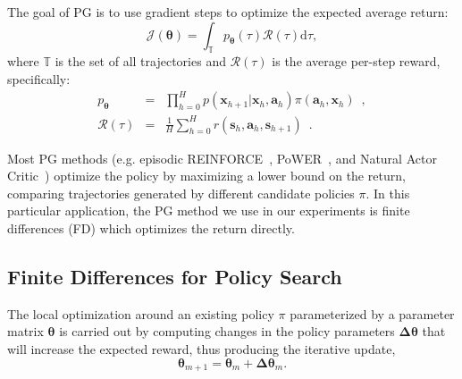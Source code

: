 \documentclass{aamas2016}
\begin{document}
The goal of PG is to use gradient steps to optimize the expected average return:
\begin{equation}
 \mathcal{J}(\boldsymbol{\theta})=\int_{\mathbb{T}}p_{\boldsymbol{\theta}}(\tau)\mathcal{R}(\tau)\mbox{d}\tau,
 \label{retPG}
\end{equation}
where $\mathbb{T}$ is the set of all trajectories and $\mathcal{R}(\tau)$ is the average per-step reward, specifically:
\begin{eqnarray}
 p_{\boldsymbol{\theta}} & = & \prod_{h=0}^{H}p(\mathbf{x}_{h+1}|\mathbf{x}_{h},\mathbf{a}_{h})\pi(\mathbf{a}_{h},\mathbf{x}_{h})  \enspace, \nonumber \\
 \mathcal{R}(\tau) & = & \frac{1}{H}\sum_{h=0}^{H} r(\mathbf{s}_{h},\mathbf{a}_{h},\mathbf{s}_{h+1})  \enspace. \nonumber
\end{eqnarray}

Most PG methods (e.g. episodic REINFORCE~\cite{williams1992simple}, PoWER~\cite{kober2009policy}, and Natural Actor 
Critic~\cite{peters2008natural}) optimize the policy by maximizing a lower bound on the return, 
comparing trajectories generated by different candidate policies $\pi$. 
In this particular application, the PG method we use in our experiments is finite differences (FD) \cite{Bagnell-2013} 
which optimizes the return directly.

\subsection{Finite Differences for Policy Search}
The local optimization around an existing policy $\pi$ parameterized by a parameter matrix $\boldsymbol{\theta}$ 
is carried out by computing changes in the policy parameters $\boldsymbol{\Delta \theta}$ that will increase the expected reward, thus
producing the iterative update,
\begin{displaymath}
 \boldsymbol{\theta}_{m+1} = \boldsymbol{\theta}_{m}+\boldsymbol{\Delta \theta}_{m}.
\end{displaymath}
\end{document}

